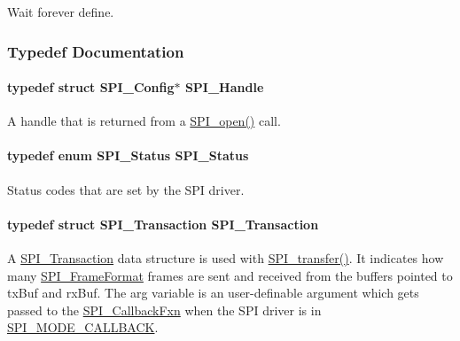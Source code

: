 Wait forever define. 



\subsubsection{Typedef Documentation}
\paragraph[{S\+P\+I\+\_\+\+Handle}]{\setlength{\rightskip}{0pt plus 5cm}typedef struct {\bf S\+P\+I\+\_\+\+Config}$\ast$ {\bf S\+P\+I\+\_\+\+Handle}}\label{_s_p_i_8h_a728806534c3c3e8675cfbfb7d8e36f13}


A handle that is returned from a \hyperlink{_s_p_i_8h_a62cfe494cb1df47cd602e8747e894fd1}{S\+P\+I\+\_\+open()} call. 

\paragraph[{S\+P\+I\+\_\+\+Status}]{\setlength{\rightskip}{0pt plus 5cm}typedef enum {\bf S\+P\+I\+\_\+\+Status}  {\bf S\+P\+I\+\_\+\+Status}}\label{_s_p_i_8h_adf1c6e6f919dd9f6887da6590a52fd6a}


Status codes that are set by the S\+P\+I driver. 

\paragraph[{S\+P\+I\+\_\+\+Transaction}]{\setlength{\rightskip}{0pt plus 5cm}typedef struct {\bf S\+P\+I\+\_\+\+Transaction}  {\bf S\+P\+I\+\_\+\+Transaction}}\label{_s_p_i_8h_a906af7b4126dcfc52dfa905eb08408fc}


A \hyperlink{struct_s_p_i___transaction}{S\+P\+I\+\_\+\+Transaction} data structure is used with \hyperlink{_s_p_i_8h_a989e17f96b54fcc3dc2cac5f8ac6bdb2}{S\+P\+I\+\_\+transfer()}. It indicates how many \hyperlink{_s_p_i_8h_a53949638d43ae7bf71b74c2b136ad206}{S\+P\+I\+\_\+\+Frame\+Format} frames are sent and received from the buffers pointed to tx\+Buf and rx\+Buf. The arg variable is an user-\/definable argument which gets passed to the \hyperlink{_s_p_i_8h_a207e2d5a7e7ea5606b6995b6485ca015}{S\+P\+I\+\_\+\+Callback\+Fxn} when the S\+P\+I driver is in \hyperlink{_s_p_i_8h_ab9ea76c6529d6076eee5e1c4a5a92c6fa5631e69925c47a62a261c78ebbda39fb}{S\+P\+I\+\_\+\+M\+O\+D\+E\+\_\+\+C\+A\+L\+L\+B\+A\+C\+K}. 

